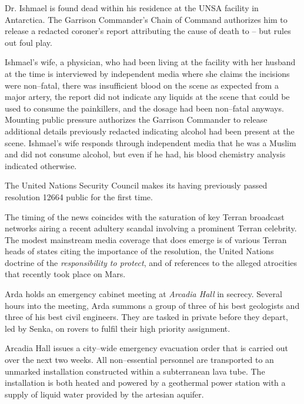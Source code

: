 Dr. Ishmael is found dead within his residence at the UNSA facility in Antarctica. The Garrison Commander's Chain of Command authorizes him to release a redacted coroner's report attributing the cause of death to  -- but rules out foul play. 

Ishmael's wife, a physician, who had been living at the facility with her husband at the time is interviewed by independent media where she claims the incisions were non--fatal, there was insufficient blood on the scene as expected from a major artery, the report did not indicate any liquids at the scene that could be used to consume the painkillers, and the dosage had been non--fatal anyways. Mounting public pressure authorizes the Garrison Commander to release additional details previously redacted indicating alcohol had been present at the scene. Ishmael's wife responds through independent media that he was a Muslim and did not consume alcohol, but even if he had, his blood chemistry analysis indicated otherwise.
\StopTimelineDate

The United Nations Security Council makes its having previously passed resolution 12664 public for the first time. 

The timing of the news coincides with the saturation of key Terran broadcast networks airing a recent adultery scandal involving a prominent Terran celebrity. The modest mainstream media coverage that does emerge is of various Terran heads of states citing the importance of the resolution, the United Nations doctrine of the {\it responsibility to protect}, and of references to the alleged atrocities that recently took place on Mars.
\StopTimelineDate

Arda holds an emergency cabinet meeting at {\it Arcadia Hall} in secrecy. Several hours into the meeting, Arda summons a group of three of his best geologists and three of his best civil engineers. They are tasked in private before they depart, led by Senka, on rovers to fulfil their high priority assignment.
\StopTimelineDate

Arcadia Hall issues a city--wide emergency evacuation order that is carried out over the next two weeks. All non--essential personnel are transported to an unmarked installation constructed within a subterranean lava tube. The installation is both heated and powered by a geothermal power station with a supply of liquid water provided by the artesian aquifer.
\StopTimelineDate

